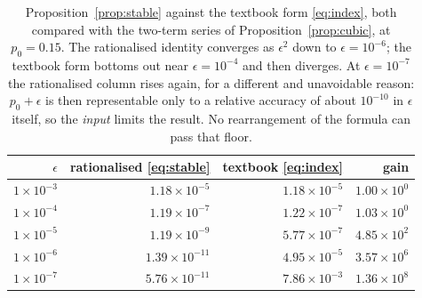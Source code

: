 \documentclass[11pt,reqno]{amsart}
\theoremstyle{plain}
\theoremstyle{definition}
\theoremstyle{remark}
\numberwithin{equation}{section}
\begin{document}
\begin{table}[ht]
\centering\small\setlength{\tabcolsep}{6pt}
\caption{Proposition~\ref{prop:stable} against the textbook form \eqref{eq:index}, both compared with the two-term series of Proposition~\ref{prop:cubic}, at $p_0=0.15$. The rationalised identity converges as $\epsilon^2$ down to $\epsilon=10^{-6}$; the textbook form bottoms out near $\epsilon=10^{-4}$ and then diverges. At $\epsilon=10^{-7}$ the rationalised column rises again, for a different and unavoidable reason: $p_0+\epsilon$ is then representable only to a relative accuracy of about $10^{-10}$ in $\epsilon$ itself, so the \emph{input} limits the result. No rearrangement of the formula can pass that floor.}
\label{tab:identity}
\begin{tabular}{@{}r r r r@{}}
\toprule
$\epsilon$ & rationalised \eqref{eq:stable} & textbook \eqref{eq:index} & gain\\
\midrule
$1\times10^{-3}$ & $1.18 \times 10^{-5}$ & $1.18 \times 10^{-5}$ & $1.00 \times 10^{0}$\\
$1\times10^{-4}$ & $1.19 \times 10^{-7}$ & $1.22 \times 10^{-7}$ & $1.03 \times 10^{0}$\\
$1\times10^{-5}$ & $1.19 \times 10^{-9}$ & $5.77 \times 10^{-7}$ & $4.85 \times 10^{2}$\\
$1\times10^{-6}$ & $1.39 \times 10^{-11}$ & $4.95 \times 10^{-5}$ & $3.57 \times 10^{6}$\\
$1\times10^{-7}$ & $5.76 \times 10^{-11}$ & $7.86 \times 10^{-3}$ & $1.36 \times 10^{8}$\\
\bottomrule
\end{tabular}
\end{table}
\end{document}
